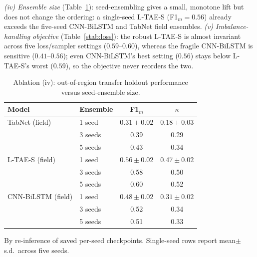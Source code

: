 \documentclass[preprint,authoryear,3p]{elsarticle}
\begin{document}
\emph{(iv) Ensemble size} (Table~\ref{stab:ens}): seed-ensembling gives a small, monotone lift but
does not change the ordering: a single-seed L-TAE-S (F1$_m=0.56$) already exceeds the five-seed
CNN-BiLSTM and TabNet field ensembles. \emph{(v) Imbalance-handling objective}
(Table~\ref{stab:loss}): the robust L-TAE-S is almost invariant across five loss/sampler settings
($0.59$--$0.60$), whereas the fragile CNN-BiLSTM is sensitive ($0.41$--$0.56$); even CNN-BiLSTM's
best setting ($0.56$) stays below L-TAE-S's worst ($0.59$), so the objective never reorders the two.

\begin{table}[!t]
\centering
\scriptsize
\caption{Ablation (iv): out-of-region transfer holdout performance versus seed-ensemble size.}
\label{stab:ens}
\renewcommand{\arraystretch}{1.12}
\setlength{\tabcolsep}{8pt}
\begin{tabular}{llcc}
\toprule
\textbf{Model} & \textbf{Ensemble} & \textbf{F1$_m$} & \textbf{$\kappa$} \\
\midrule
TabNet (field)     & 1 seed  & $0.31\pm0.02$ & $0.18\pm0.03$ \\
                   & 3 seeds & 0.39 & 0.29 \\
                   & 5 seeds & 0.43 & 0.34 \\
\midrule
L-TAE-S (field)    & 1 seed  & $0.56\pm0.02$ & $0.47\pm0.02$ \\
                   & 3 seeds & 0.58 & 0.50 \\
                   & 5 seeds & 0.60 & 0.52 \\
\midrule
CNN-BiLSTM (field) & 1 seed  & $0.48\pm0.02$ & $0.31\pm0.02$ \\
                   & 3 seeds & 0.52 & 0.34 \\
                   & 5 seeds & 0.51 & 0.33 \\
\bottomrule
\end{tabular}
\par\vspace{3pt}
\begin{minipage}{\linewidth}
\footnotesize
By re-inference of saved per-seed checkpoints. Single-seed rows report mean$\pm$s.d.\ across five seeds.
\end{minipage}
\end{table}
\end{document}
